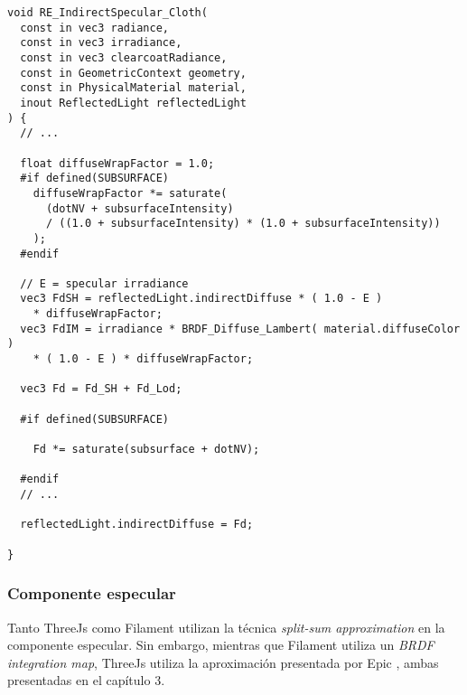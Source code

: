 

      \begin{lstlisting}[caption=Conservaci\'on de la energ\'ia y \textit{wrapped diffuse lightning} aplicados en la funci\'on de luz indirecta especular]
void RE_IndirectSpecular_Cloth(
  const in vec3 radiance,
  const in vec3 irradiance,
  const in vec3 clearcoatRadiance,
  const in GeometricContext geometry,
  const in PhysicalMaterial material,
  inout ReflectedLight reflectedLight
) {
  // ...

  float diffuseWrapFactor = 1.0;
  #if defined(SUBSURFACE)
    diffuseWrapFactor *= saturate(
      (dotNV + subsurfaceIntensity)
      / ((1.0 + subsurfaceIntensity) * (1.0 + subsurfaceIntensity))
    );
  #endif

  // E = specular irradiance
  vec3 FdSH = reflectedLight.indirectDiffuse * ( 1.0 - E )
    * diffuseWrapFactor;
  vec3 FdIM = irradiance * BRDF_Diffuse_Lambert( material.diffuseColor )
    * ( 1.0 - E ) * diffuseWrapFactor;

  vec3 Fd = Fd_SH + Fd_Lod;

  #if defined(SUBSURFACE)

    Fd *= saturate(subsurface + dotNV);

  #endif
  // ...

  reflectedLight.indirectDiffuse = Fd;

}
      \end{lstlisting}

      \singlespacing

    \subsubsection{Componente especular}
      Tanto ThreeJs como Filament utilizan la t\'ecnica \textit{split-sum approximation} \autocite{dfgapproximation}
      en la componente especular. Sin embargo, mientras que Filament utiliza un \textit{BRDF integration map},
      ThreeJs utiliza la aproximaci\'on presentada por Epic \autocite{dfgapproximation}, ambas presentadas en
      el cap\'itulo 3.\\

